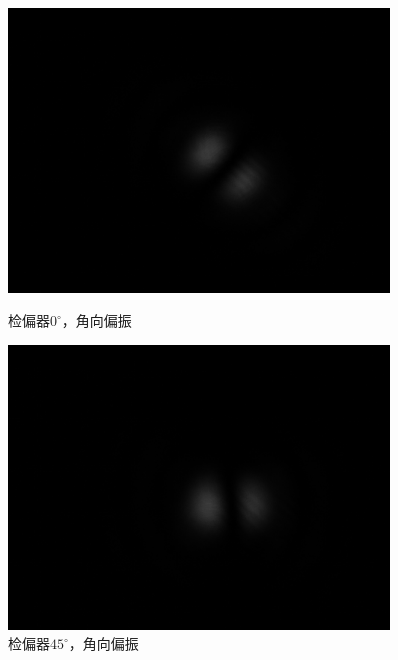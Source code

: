 \documentclass[a4paper,UTF8]{ctexart}
\begin{document}
\begin{figure}[H]
    \centering
    \begin{minipage}[b]{0.45\textwidth}
        \centering
        \includegraphics[width=0.9\textwidth]{./fig/1_5.png}
        \caption{检偏器$0^{\circ}$，角向偏振}
    \end{minipage}
    \begin{minipage}[b]{0.45\textwidth}
        \centering
        \includegraphics[width=0.9\textwidth]{./fig/1_8.png}
        \caption{检偏器$45^{\circ}$，角向偏振}
    \end{minipage}
\end{figure}
\end{document}
